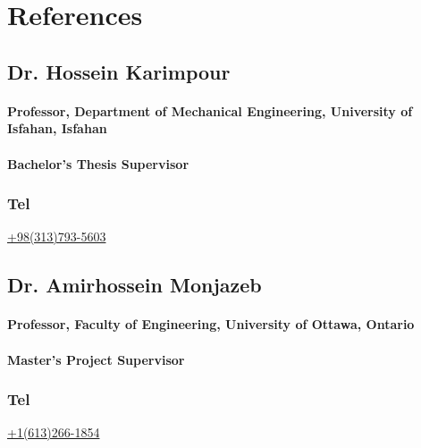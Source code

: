 \documentclass[a4paper]{article}
\begin{document}
\section{References}
\subsection{Dr. Hossein Karimpour}
\paragraph{\bfseries Professor, Department of Mechanical Engineering, University of Isfahan, Isfahan}
\paragraph{\bfseries Bachelor's Thesis Supervisor}

{\large\subsubsection{Tel} {\href{tel:+983137935603}{+98(313)793-5603}}}

\Large\href{mailto:h.karimpour@eng.ui.ac.ir}{}
\Large\href{http://eng.ui.ac.ir/~h.karimpour}{}
\Large\href{https://www.linkedin.com/in/hossein-karimpour-38373811a}{}

\subsection{Dr. Amirhossein Monjazeb}
\paragraph{\bfseries Professor, Faculty of Engineering, University of Ottawa, Ontario}
\paragraph{\bfseries Master's Project Supervisor}

{\large\subsubsection{Tel} {\href{tel:+16132661854}{+1(613)266-1854}}}

\Large\href{mailto:amirhossein.monjazeb@uottawa.ca}{}
\Large\href{https://uniweb.uottawa.ca/members/5272/profile}{}
\Large\href{https://www.linkedin.com/in/amirhossein-monjazeb-0041625b/?originalSubdomain=ca}{}
    
\end{document}
